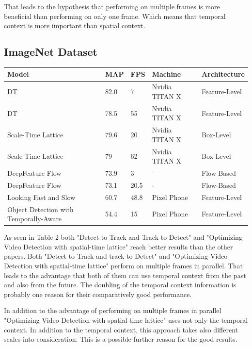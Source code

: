 \documentclass[conference]{IEEEtran}
\begin{document}
That leads to the hypothesis that performing on multiple frames is more beneficial than performing on only one frame. Which means that temporal context is more important than spatial context.   

\subsection{ImageNet Dataset}

\begin{tabular}{ | p{2cm} | p{2em}| p{2em} | p{4em} | p{5em} | } 
 \hline
 Model & MAP & FPS & Machine & Architecture \\
 \hline
 DT \cite{b8} & 82.0 & 7 & Nvidia TITAN X & Feature-Level \\
 \hline
 DT \cite{b8} & 78.5 & 55 & Nvidia TITAN X & Feature-Level \\
 \hline
 Scale-Time Lattice \cite{b10} & 79.6 & 20 & Nvidia TITAN X & Box-Level \\
 \hline
 Scale-Time Lattice \cite{b10} & 79 & 62 & Nvidia TITAN X & Box-Level \\
 \hline
 DeepFeature Flow \cite{b3} & 73.9 & 3 & - & Flow-Based \\
 \hline
 DeepFeature Flow \cite{b3} & 73.1 & 20.5 & - & Flow-Based \\
 \hline
 Looking Fast and Slow \cite{b7} & 60.7 & 48.8 & Pixel Phone & Feature-Level \\
 \hline
 Object Detection with Temporally-Aware \cite{b2} & 54.4 & 15 & Pixel Phone & Feature-Level \\
 \hline
\end{tabular} \newline

As seen in Table 2 both "Detect to Track and Track to Detect" and "Optimizing Video Detection with spatial-time lattice" reach better results than the other papers. Both "Detect to Track and track to Detect" and "Optimizing Video Detection with spatial-time lattice" perform on multiple frames in parallel. That leads to the advantage that both of them can use temporal context from the past and also from the future. The doubling of the temporal context information is probably one reason for their comparatively good performance. \newline

In addition to the advantage of performing on multiple frames in parallel "Optimizing Video Detection with spatial-time lattice" uses not only the temporal context. In addition to the temporal context, this approach takes also different scales into consideration. This is a possible further reason for the good results. \newline
\end{document}
